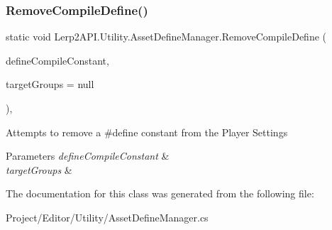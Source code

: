 \subsubsection{\texorpdfstring{Remove\+Compile\+Define()}{RemoveCompileDefine()}}
{\footnotesize\ttfamily static void Lerp2\+A\+P\+I.\+Utility.\+Asset\+Define\+Manager.\+Remove\+Compile\+Define (\begin{DoxyParamCaption}\item[{string}]{define\+Compile\+Constant,  }\item[{Build\+Target\+Group \mbox{[}$\,$\mbox{]}}]{target\+Groups = {\ttfamily null} }\end{DoxyParamCaption})\hspace{0.3cm}{\ttfamily [inline]}, {\ttfamily [static]}}



Attempts to remove a \#define constant from the Player Settings 


\begin{DoxyParams}{Parameters}
{\em define\+Compile\+Constant} & \\
\hline
{\em target\+Groups} & \\
\hline
\end{DoxyParams}


The documentation for this class was generated from the following file\+:\begin{DoxyCompactItemize}
\item 
Project/\+Editor/\+Utility/Asset\+Define\+Manager.\+cs\end{DoxyCompactItemize}
